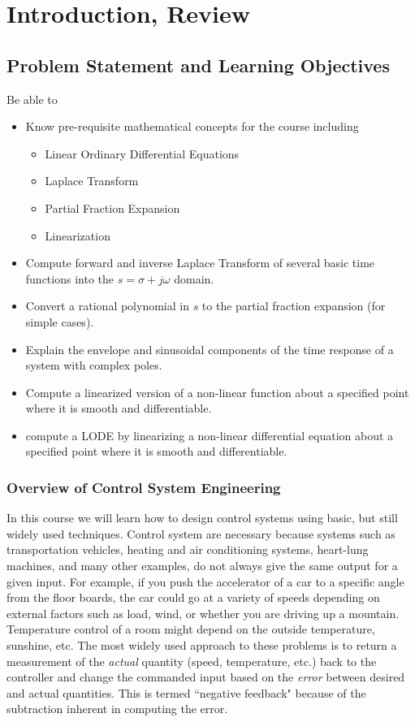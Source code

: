 %
%
%

\chapter{Introduction, Review}

\section{Problem Statement and Learning Objectives}

Be able to
\begin{itemize}
    \item Know pre-requisite mathematical concepts for the course including
    \begin{itemize}
        \item Linear Ordinary Differential Equations
        \item Laplace Transform
        \item Partial Fraction Expansion
        \item Linearization
    \end{itemize}
    \item Compute forward and inverse Laplace Transform of several basic time functions into the $s=\sigma+j\omega$ domain. 
    \item Convert a rational polynomial in $s$ to the partial fraction expansion (for simple cases).
    \item Explain the envelope and sinusoidal components of the time response of a system with complex poles.
    \item Compute a linearized version of a non-linear function about a specified point where it is smooth and differentiable.
    \item compute a LODE by linearizing a non-linear differential equation about a specified point where it is smooth and differentiable.     
\end{itemize}
 

\subsection{Overview of Control System Engineering}


In this course we will learn how to design control systems using basic, but still widely used techniques.   
Control system are necessary because systems such as transportation vehicles, heating and air conditioning systems, 
heart-lung machines, and many other examples, do not always give the same output for a given input.  For example, 
if you push the accelerator of a car to a specific angle from the floor boards, the car could go at a variety of speeds
depending on external factors such as load, wind, or whether you are driving up a mountain.   Temperature control of a room
might depend on the outside temperature, sunshine, etc.   The most widely used approach to these problems is to 
return a measurement of the {\it actual } quantity (speed, temperature, etc.) back to the controller and change the 
commanded input based on the {\it error} between desired and actual quantities.    This is termed ``negative feedback" 
because of the subtraction inherent in computing the error. 

